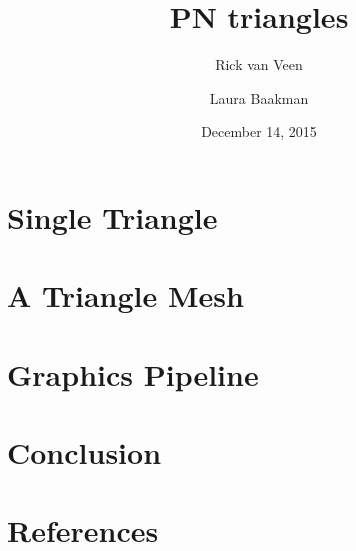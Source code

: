 \documentclass[13pt]{beamer}
\title{PN triangles}
\author{Rick van Veen \and Laura Baakman}
\date{December 14, 2015}
\institute{Advanced Computer Graphics}
\begin{document}
	\begin{frame}
		\titlepage
	\end{frame}

	

	\section{Single Triangle}
	

	\section{A Triangle Mesh}
	

	\section{Graphics Pipeline}
	

	\section{Conclusion}
	

	\section{References}
	
\end{document}
